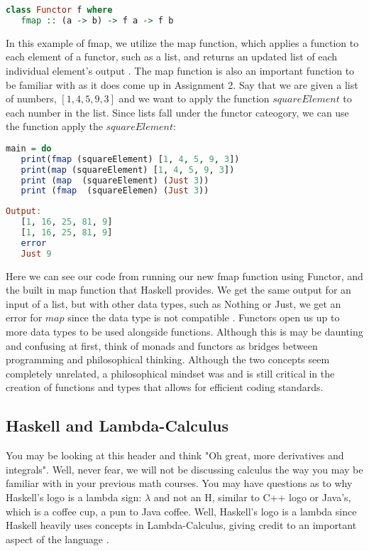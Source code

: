 \documentclass{article}
\begin{document}
\begin{lstlisting}[language=haskell] 
class Functor f where 
   fmap :: (a -> b) -> f a -> f b 
\end{lstlisting}

\medskip\noindent
In this example of fmap, we utilize the map function, which applies a function to each element of a functor, such as a list, and returns an updated list of each individual element's output \cite{TP Functors}. The map function is also an important function to be familiar with as it does come up in Assignment 2. Say that we are given a list of numbers, $[1, 4, 5, 9, 3]$ and we want to apply the function $squareElement$ to each number in the list. Since lists fall under the functor cateogory, we can use the function apply the $squareElement$:

\begin{lstlisting}[language=haskell] 
main = do  
   print(fmap (squareElement) [1, 4, 5, 9, 3])
   print(map (squareElement) [1, 4, 5, 9, 3])
   print (map  (squareElement) (Just 3))
   print (fmap  (squareElemen) (Just 3))
\end{lstlisting}

\begin{lstlisting}[language=haskell] 
Output:
   [1, 16, 25, 81, 9]
   [1, 16, 25, 81, 9]
   error
   Just 9
\end{lstlisting}

\medskip\noindent
Here we can see our code from running our new fmap function using Functor, and the built in map function that Haskell provides. We get the same output for an input of a list, but with other data types, such as Nothing or Just, we get an error for $map$ since the data type is not compatible \cite{TP Functors}. Functors open us up to more data types to be used alongside functions. Although this is may be daunting and confusing at first, think of monads and functors as bridges between programming and philosophical thinking. Although the two concepts seem completely unrelated, a philosophical mindset was and is still critical in the creation of functions and types that allows for efficient coding standards.

\subsection{Haskell and Lambda-Calculus}

You may be looking at this header and think "Oh great, more derivatives and integrals". Well, never fear, we will not be discussing calculus the way you may be familiar with in your previous math courses. You may have questions as to why Haskell's logo is a lambda sign: $\lambda$ and not an H, similar to C++ logo or Java's, which is a coffee cup, a pun to Java coffee. Well, Haskell's logo is a lambda since Haskell heavily uses concepts in Lambda-Calculus, giving credit to an important aspect of the language \cite{Haskell Logo}.
\end{document}
